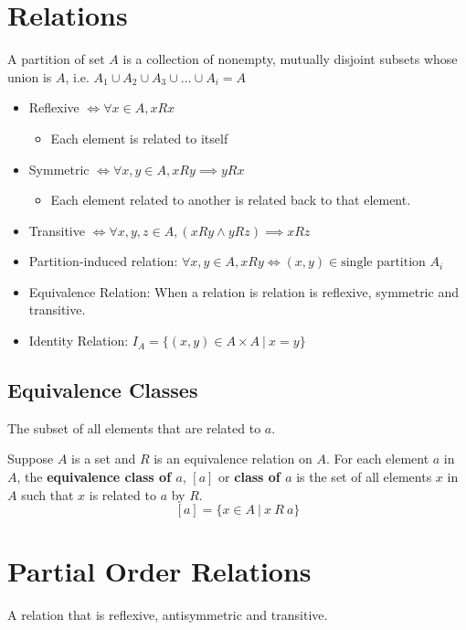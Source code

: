 \documentclass[landscape, letterpaper, 8pt]{extarticle}
\begin{document}
\begin{multicols}{2}
    \section*{Relations}
    A partition of set $A$ is a collection of nonempty, mutually disjoint subsets whose union is $A$, i.e. $A_1 \cup A_2 \cup A_3 \cup \ldots \cup A_i = A$
    \begin{itemize}[noitemsep,nolistsep]
        \item Reflexive $ \iff \forall x \in A, x R x$
              \begin{itemize}[noitemsep,nolistsep]
                  \item Each element is related to itself
              \end{itemize}
        \item Symmetric $ \iff \forall x, y \in A, x R y \implies y R x$
              \begin{itemize}[noitemsep,nolistsep]
                  \item Each element related to another is related back to that element.
              \end{itemize}
        \item Transitive $\iff \forall x, y, z \in A, (x R y \land y R z)\implies x R z$
        \item Partition-induced relation: $\forall x, y \in A, x R y \iff (x, y) \in \text{single partition }A_i$
        \item Equivalence Relation: When a relation is relation is reflexive, symmetric and transitive.
        \item Identity Relation: $I_A = \{(x, y) \in A \times A~|~x=y\}$
    \end{itemize}
    \subsection*{Equivalence Classes}
    The subset of all elements that are related to $a$.

    Suppose $A$ is a set and $R$ is an equivalence relation on $A$. For each element $a$ in $A$, the \textbf{equivalence class of $a$}, $[a]$ or \textbf{class of $a$} is the set of all elements $x$ in $A$ such that $x$ is related to $a$ by $R$. $$[a] = \{x \in A~|~x~R~a\}$$
    \section*{Partial Order Relations}
    A relation that is reflexive, antisymmetric and transitive.

\end{multicols}
\end{document}
